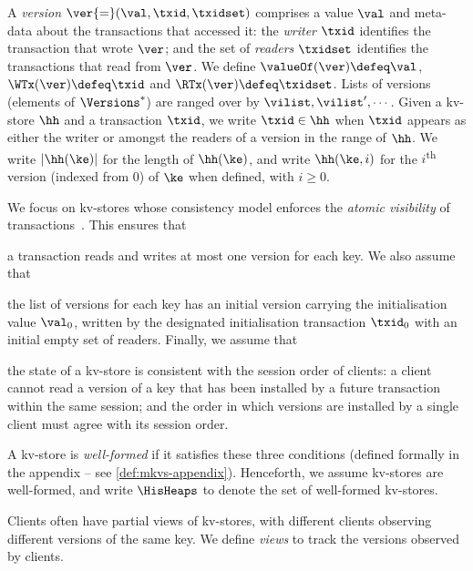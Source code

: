 

A \emph{version} $\ver {=} (\val, \txid, \txidset)$ comprises  a value $\val$
and meta-data about the transactions that accessed it: the \emph{writer} $\txid$ identifies the transaction that wrote $\ver$;
and the set of \emph{readers} $\txidset$ identifies  the  transactions
that read from  $\ver$.
We define $\valueOf(\ver) \defeq \val$,
$\WTx(\ver) \defeq \txid$ and $\RTx(\ver) \defeq \txidset$. 
Lists of versions (elements of $\Versions^{\ast}$) are ranged over by $\vilist, \vilist',\cdots$.
Given a kv-store $\hh$ and a transaction $\txid$, we write 
$\txid \in \hh$ when $\txid$ appears as either the writer or amongst the readers of a version in the range of $\hh$.
We write  $\lvert \hh(\ke) \rvert$ for the length of $\hh(\ke)$, 
and write $\hh(\ke, i)$ for the $i$\textsuperscript{th} version (indexed from 0) of $\ke$ when defined, with $i \geq 0$.


We focus on kv-stores whose consistency model enforces the \emph{atomic visibility} of transactions~\cite{framework-concur}. 
This ensures that 
\begin{enumerate*}
	\item a transaction reads and writes at most one version for each key.
We also assume that 
	\item the list of versions for each key has an initial version 
carrying the initialisation value $\val_0$,  written by the designated initialisation transaction $\txid_0$ 
with an initial empty set of readers.
Finally, we assume that 
	\item the state of a kv-store is consistent with 
the session order of clients: a client cannot read a version of a key that has 
been installed by a future transaction within the same session;  and 
the order in which versions are installed by a single client must agree 
with its session order. 
\end{enumerate*}
A kv-store is \emph{well-formed} if it satisfies these three conditions (defined formally in the appendix -- see \cref{def:mkvs-appendix}). 
Henceforth, we assume kv-stores are well-formed, and write  $\HisHeaps$ to denote 
the set of well-formed kv-stores.

Clients often have partial views of kv-stores, 
with different clients observing 
different versions of the same key.
We define \emph{views} to track the versions observed by clients. 

